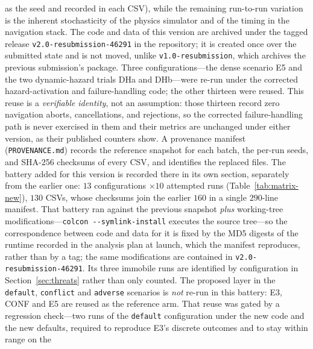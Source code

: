 as the seed and recorded in each CSV), while the remaining run-to-run variation is
the inherent stochasticity of the physics simulator and of the timing in the
navigation stack. The code and data of this version are archived under the tagged
release \texttt{v2.0-resubmission-46291} in the repository; it is created once over
the submitted state and is not moved, unlike \texttt{v1.0-resubmission}, which
archives the previous submission's package. Three configurations---the dense
scenario E5 and the two dynamic-hazard trials DHa and DHb---were re-run under the
corrected hazard-activation and failure-handling code; the other thirteen were
reused. This reuse is a \emph{verifiable identity}, not an assumption: those
thirteen record zero navigation aborts, cancellations, and rejections, so the
corrected failure-handling path is never exercised in them and their metrics are
unchanged under either version, as their published counters show. %
A provenance
manifest (\texttt{PROVENANCE.md}) records the reference snapshot for each batch, the
per-run seeds, and SHA-256 checksums of every CSV, and identifies the replaced
files. The battery added for this version is recorded there in its own section,
separately from the earlier one: $13$ configurations $\times10$ attempted runs
(Table~\ref{tab:matrix-new}), $130$ CSVs, whose checksums join the earlier $160$ in
a single $290$-line manifest. That battery ran against the previous snapshot
\emph{plus} working-tree modifications---\texttt{colcon -{}-symlink-install} executes
the source tree---so the correspondence between code and data for it is fixed by the
MD5 digests of the runtime recorded in the analysis plan at launch, which the
manifest reproduces, rather than by a tag; the same modifications are contained in
\texttt{v2.0-resubmission-46291}. Its three immobile runs
are identified by configuration in Section~\ref{sec:threats} rather than only
counted. The proposed layer in the \texttt{default}, \texttt{conflict} and
\texttt{adverse} scenarios is \emph{not} re-run in this battery: E3, CONF and E5
are reused as the reference arm. That reuse was gated by a regression check---two
runs of the \texttt{default} configuration under the new code and the new defaults,
required to reproduce E3's discrete outcomes and to stay within range on the
